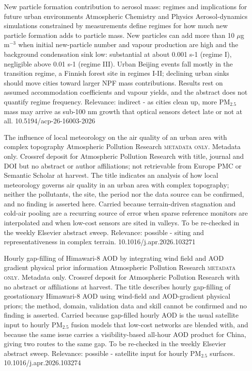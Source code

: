 \documentclass[10pt]{article}
\begin{document}
{New particle formation contribution to aerosol mass: regimes and implications for future urban environments}
{Atmospheric Chemistry and Physics}
{Aerosol-dynamics simulations constrained by measurements define regimes for how much new particle formation adds to particle mass. New particles can add more than 10 $\mu$g\,m$^{-3}$ when initial new-particle number and vapour production are high and the background condensation sink low: substantial at about 0.001 s-1 (regime I), negligible above 0.01 s-1 (regime III). Urban Beijing events fall mostly in the transition regime, a Finnish forest site in regimes I-II; declining urban sinks should move cities toward larger NPF mass contributions. Results rest on assumed accommodation coefficients and vapour yields, and the abstract does not quantify regime frequency. Relevance: indirect - as cities clean up, more PM$_{2.5}$ mass may arrive as sub-100 nm growth that optical sensors detect late or not at all.}
{10.5194/acp-26-16003-2026}

{The influence of local meteorology on the air quality of an urban area with complex topography}
{Atmospheric Pollution Research}
{\textsc{metadata only.} Metadata only. Crossref deposit for Atmospheric Pollution Research with title, journal and DOI but no abstract or author affiliations; not retrievable from Europe PMC or Semantic Scholar at harvest. The title indicates an analysis of how local meteorology governs air quality in an urban area with complex topography; neither the pollutants, the site, the period nor the data source can be confirmed, and no finding is asserted here. Carried because terrain-driven stagnation and cold-air pooling are a recurring source of error when sparse reference monitors are interpolated and when low-cost sensors are sited in valleys. To be re-checked in the weekly Elsevier abstract sweep. Relevance: possible - siting and representativeness in complex terrain.}
{10.1016/j.apr.2026.103271}

{Hourly gap-filling of Himawari-8 AOD by integrating wind field and AOD gradient physical prior information}
{Atmospheric Pollution Research}
{\textsc{metadata only.} Metadata only. Crossref deposit for Atmospheric Pollution Research with no abstract or affiliations at harvest. The title describes hourly gap-filling of geostationary Himawari-8 AOD using wind-field and AOD-gradient physical priors; the method, domain, validation data and skill cannot be confirmed and no finding is asserted. Carried because gap-filled hourly AOD is the usual satellite input to hourly PM$_{2.5}$ fusion models that low-cost networks are blended with, and because the same issue carries a visibility-based all-hour AOD product for China, giving two routes to the same gap. To be re-checked in the weekly Elsevier abstract sweep. Relevance: possible - satellite input for hourly PM$_{2.5}$ surfaces.}
{10.1016/j.apr.2026.103274}
\end{document}
